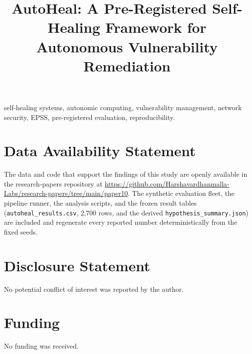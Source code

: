 \documentclass[journal]{IEEEtran}
\title{AutoHeal: A Pre-Registered Self-Healing Framework for Autonomous
Vulnerability Remediation}
\author{%
  \IEEEauthorblockN{Harshavardhan Malla}
  \IEEEauthorblockA{Independent Researcher\\
  Email: harshavardhanmalla75@gmail.com}%
}
\begin{document}
\maketitle

\begin{abstract}

\end{abstract}

\begin{IEEEkeywords}
self-healing systems, autonomic computing, vulnerability management,
network security, EPSS, pre-registered evaluation, reproducibility.
\end{IEEEkeywords}













\section*{Data Availability Statement}
The data and code that support the findings of this study are openly
available in the research-papers repository at
\url{https://github.com/Harshavardhanmalla-Labs/research-papers/tree/main/paper10}.
The synthetic evaluation fleet, the pipeline runner, the analysis
scripts, and the frozen result tables (\texttt{autoheal\_results.csv},
2{,}700 rows, and the derived \texttt{hypothesis\_summary.json}) are
included and regenerate every reported number deterministically from
the fixed seeds.

\section*{Disclosure Statement}
No potential conflict of interest was reported by the author.

\section*{Funding}
No funding was received.
\end{document}

